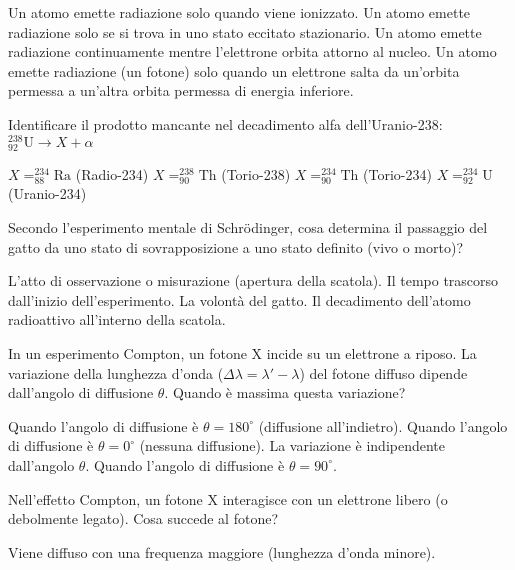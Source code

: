\documentclass{exam}%
\begin{document}
\begin{questions}
\begin{choices}
\choice Un atomo emette radiazione solo quando viene ionizzato.%
\choice Un atomo emette radiazione solo se si trova in uno stato eccitato stazionario.%
\choice Un atomo emette radiazione continuamente mentre l'elettrone orbita attorno al nucleo.%
\choice Un atomo emette radiazione (un fotone) solo quando un elettrone salta da un'orbita permessa a un'altra orbita permessa di energia inferiore.%
\end{choices}%
\question Identificare il prodotto mancante nel decadimento alfa dell'Uranio-238: $^{238}_{92}\text{U} \rightarrow X + \alpha$%
\vspace{0.2em}%
\begin{multicols}{4}%
\begin{choices}%
\choice $X = ^{234}_{88}\text{Ra}$ (Radio-234)%
\choice $X = ^{238}_{90}\text{Th}$ (Torio-238)%
\choice $X = ^{234}_{90}\text{Th}$ (Torio-234)%
\choice $X = ^{234}_{92}\text{U}$ (Uranio-234)%
\end{choices}%
\end{multicols}%
\question Secondo l'esperimento mentale di Schrödinger, cosa determina il passaggio del gatto da uno stato di sovrapposizione a uno stato definito (vivo o morto)?%
\vspace{0.2em}%
\begin{choices}%
\choice L'atto di osservazione o misurazione (apertura della scatola).%
\choice Il tempo trascorso dall'inizio dell'esperimento.%
\choice La volontà del gatto.%
\choice Il decadimento dell'atomo radioattivo all'interno della scatola.%
\end{choices}%
\question In un esperimento Compton, un fotone X incide su un elettrone a riposo. La variazione della lunghezza d'onda ($\Delta \lambda = \lambda' - \lambda$) del fotone diffuso dipende dall'angolo di diffusione $\theta$. Quando è massima questa variazione?%
\vspace{0.2em}%
\begin{choices}%
\choice Quando l'angolo di diffusione è $\theta = 180^\circ$ (diffusione all'indietro).%
\choice Quando l'angolo di diffusione è $\theta = 0^\circ$ (nessuna diffusione).%
\choice La variazione è indipendente dall'angolo $\theta$.%
\choice Quando l'angolo di diffusione è $\theta = 90^\circ$.%
\end{choices}%
\question Nell'effetto Compton, un fotone X interagisce con un elettrone libero (o debolmente legato). Cosa succede al fotone?%
\vspace{0.2em}%
\begin{choices}%
\choice Viene diffuso con una frequenza maggiore (lunghezza d'onda minore).%

\end{choices}
\end{questions}
\end{document}
